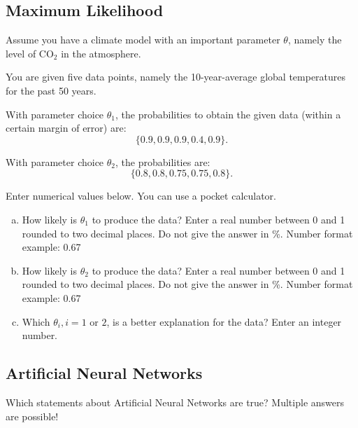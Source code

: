 \documentclass{article}
\begin{document}
\subsection*{Maximum Likelihood}

Assume you have a climate model with an important parameter \(\theta\), namely the level of CO\(_2\) in the atmosphere.

You are given five data points, namely the 10-year-average global temperatures for the past 50 years.

With parameter choice \(\theta_1\), the probabilities to obtain the given data (within a certain margin of error) are: 
\[
\{0.9, 0.9, 0.9, 0.4, 0.9\}.
\]

With parameter choice \(\theta_2\), the probabilities are:
\[
\{0.8, 0.8, 0.75, 0.75, 0.8\}.
\]

Enter numerical values below. You can use a pocket calculator.
\begin{enumerate}[(a)]
    \item How likely is \(\theta_1\) to produce the data? Enter a real number between 0 and 1 rounded to two decimal places. Do not give the answer in \%. Number format example: 0.67
    \item How likely is \(\theta_2\) to produce the data? Enter a real number between 0 and 1 rounded to two decimal places. Do not give the answer in \%. Number format example: 0.67
    \item Which \(\theta_i, i = 1 \text{ or } 2\), is a better explanation for the data? Enter an integer number.
\end{enumerate}

\subsection*{Artificial Neural Networks}

Which statements about Artificial Neural Networks are true? Multiple answers are possible!
\end{document}
